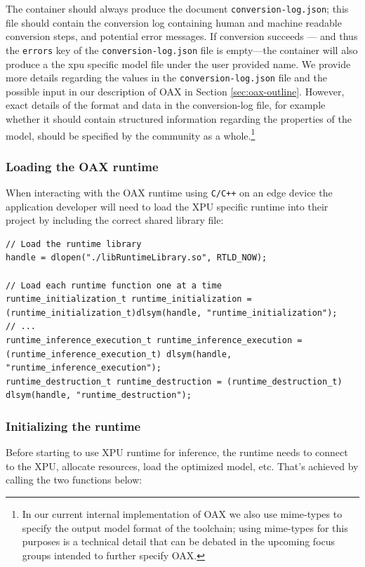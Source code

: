 \documentclass{article}
\begin{document}
The container should always produce the document \texttt{conversion-log.json}; this file should contain the conversion log containing human and machine readable conversion steps, and potential error messages. If conversion succeeds --- and thus the \texttt{errors} key of the \texttt{conversion-log.json} file is empty---the container will also produce a the xpu specific model file under the user provided name. We provide more details regarding the values in the \texttt{conversion-log.json} file and the possible input in our description of OAX in Section \ref{sec:oax-outline}. However, exact details of the format and data in the conversion-log file, for example whether it should contain structured information regarding the properties of the model, should be specified by the community as a whole.\footnote{In our current internal implementation of OAX we also use mime-types to specify the output model format of the toolchain; using mime-types for this purposes is a technical detail that can be debated in the upcoming focus groups intended to further specify OAX.}

\subsubsection{Loading the OAX runtime}

When interacting with the OAX runtime using \texttt{C/C++} on an edge device the application developer will need to load the XPU specific runtime into their project by including the correct shared library file:

\begin{lstlisting}
// Load the runtime library
handle = dlopen("./libRuntimeLibrary.so", RTLD_NOW);

// Load each runtime function one at a time
runtime_initialization_t runtime_initialization = (runtime_initialization_t)dlsym(handle, "runtime_initialization");
// ...
runtime_inference_execution_t runtime_inference_execution = (runtime_inference_execution_t) dlsym(handle, "runtime_inference_execution");
runtime_destruction_t runtime_destruction = (runtime_destruction_t) dlsym(handle, "runtime_destruction");
\end{lstlisting}

\subsubsection{Initializing the runtime}

Before starting to use XPU runtime for inference, the runtime needs to connect to the XPU, allocate resources, load the optimized model, etc.
That's achieved by calling the two functions below:
\end{document}
